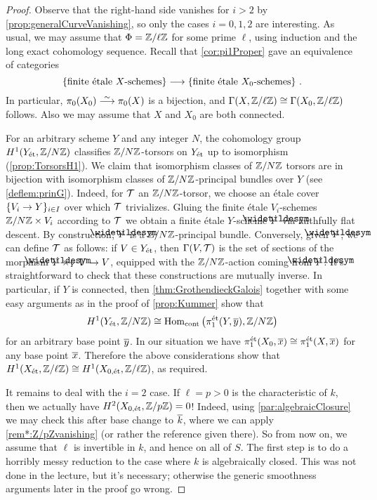 \documentclass[a4paper, 10pt, oneside, DIV=9, chapterprefix=true, numbers=enddot, bibliography=totoc]{scrbook}
\begin{document}
\begin{proof}
	Observe that the right-hand side vanishes for $i>2$ by \cref{prop:generalCurveVanishing}, so only the cases $i=0,1,2$ are interesting. As usual, we may assume that $\Phi=\mathbb{Z}/\ell\mathbb{Z}$ for some prime $\ell$, using induction and the long exact cohomology sequence. Recall that \cref{cor:pi1Proper} gave an equivalence of categories
	\begin{equation*}
		\left\{\text{finite étale $X$-schemes}\right\}\morphism \left\{\text{finite étale $X_0$-schemes}\right\}\,.
	\end{equation*}
	In particular, $\pi_0(X_0)\isomorphism \pi_0(X)$ is a bijection, and $\operatorname{\Gamma}(X,\mathbb{Z}/\ell\mathbb{Z})\cong \operatorname{\Gamma}(X_0,\mathbb{Z}/\ell\mathbb{Z})$ follows. Also we may assume that $X$ and $X_0$ are both connected. 
	
	For an arbitrary scheme $Y$ and any integer $N$, the cohomology group $H^1(Y_{\mathrm{\acute{e}t}},\mathbb{Z}/N\mathbb{Z})$ classifies $\mathbb{Z}/N\mathbb{Z}$-torsors on $Y_{\mathrm{\acute{e}t}}$ up to isomorphism (\cref{prop:TorsorsH1}). We claim that isomorphism classes of $\mathbb{Z}/N\mathbb{Z}$ torsors are in bijection with isomorphism classes of $\mathbb{Z}/N\mathbb{Z}$-principal bundles over $Y$ (see \cref{deflem:prinG}). Indeed, for $\mathcal{T}$ an $\mathbb{Z}/N\mathbb{Z}$-torsor, we choose an étale cover $\{V_i\morphism Y\}_{i\in I}$ over which $\mathcal{T}$ trivializes. Gluing the finite étale $V_i$-schemes $\mathbb{Z}/N\mathbb{Z}\times V_i$ according to $\mathcal{T}$ we obtain a finite étale $Y$-scheme $\snake{Y}$ via faithfully flat descent. By construction, $\snake{Y}$ is a $\mathbb{Z}/N\mathbb{Z}$-principal bundle. Conversely, given $\snake{Y}$, we can define $\mathcal{T}$ as follows: if $V\in Y_{\mathrm{\acute{e}t}}$, then $\operatorname{\Gamma}(V,\mathcal{T})$ is the set of sections of the morphism $\snake{Y}\times_YV\morphism V$, equipped with the $\mathbb{Z}/N\mathbb{Z}$-action coming from $\snake{Y}$. It's straightforward to check that these constructions are mutually inverse. In particular, if $Y$ is connected, then \cref{thm:GrothendieckGalois} together with some easy arguments as in the proof of \cref{prop:Kummer} show that
	\begin{equation*}
		H^1(Y_\et,\IZ/N\IZ)\cong \Hom_{\mathrm{cont}}\big(\pi_1^\et(Y,\ov{y}),\IZ/N\IZ\big)
	\end{equation*}
	for an arbitrary base point $\ov{y}$. In our situation we have $\pi_1^\et(X_0,\ov{x})\cong \pi_1^\et(X,\ov{x})$ for any base point $\ov{x}$. Therefore the above considerations show that $H^1(X_{\mathrm{\acute{e}t}},\mathbb{Z}/\ell\mathbb{Z})\cong H^1(X_{0,\mathrm{\acute{e}t}},\mathbb{Z}/\ell\mathbb{Z})$, as required.
	
	It remains to deal with the $i=2$ case. If $\ell=p>0$ is the characteristic of $k$, then we actually have $H^2(X_{0,\mathrm{\acute{e}t}},\mathbb{Z}/p\mathbb{Z})=0$! Indeed, using \cref{par:algebraicClosure} we may check this after base change to $\ov{k}$, where we can apply \cref{rem*:Z/pZvanishing} (or rather the reference given there). So from now on, we assume that $\ell$ is invertible in $k$, and hence on all of $S$. The first step is to do a horribly messy reduction to the case where $k$ is algebraically closed. This was not done in the lecture, but it's necessary; otherwise the generic smoothness arguments later in the proof go wrong.
	

\end{proof}
\end{document}
